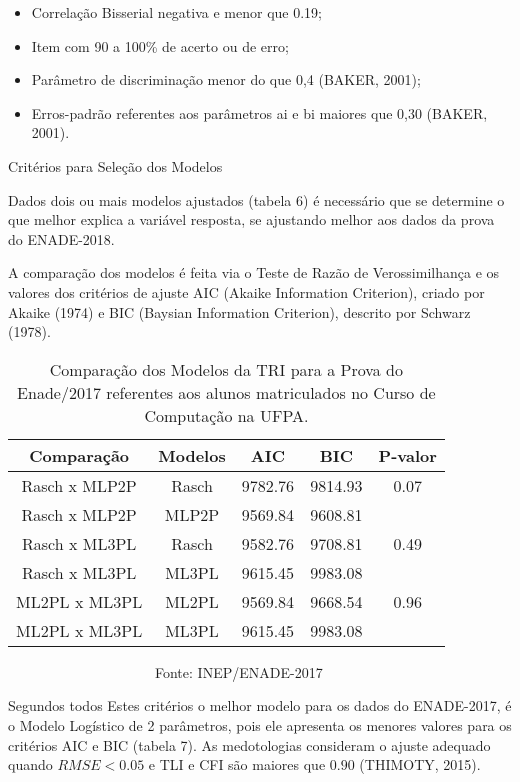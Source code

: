 \documentclass[12pt]{article}
\begin{document}
\begin{itemize}
\item Correlação Bisserial negativa e menor que 0.19;
\item Item com 90 a 100\% de acerto ou de erro;
\item Parâmetro de discriminação menor do que 0,4 (BAKER, 2001);
\item Erros-padrão referentes aos parâmetros ai e bi maiores que 0,30 (BAKER, 2001).
\end{itemize}

Critérios para Seleção dos Modelos

Dados dois ou mais modelos ajustados (tabela 6) é necessário que se determine o que melhor explica a variável resposta, se ajustando melhor aos dados da prova do ENADE-2018.

A comparação dos modelos é feita via o Teste de Razão de Verossimilhança e os valores dos critérios de ajuste AIC (Akaike Information Criterion), criado por Akaike (1974) e BIC (Baysian Information Criterion), descrito por Schwarz (1978). 

\begin{table}[h]
	\centering
	\caption{Comparação dos Modelos da TRI para a Prova do Enade/2017 referentes aos alunos matriculados no Curso de Computação na UFPA.}
\begin{tabular}{c|c|c|c|c}
\hline\hline 
     Comparação     & Modelos    & AIC       & BIC      & P-valor  \\
\hline\hline
 Rasch x MLP2P      &  Rasch     &  9782.76  & 9814.93  & 0.07       \\
 Rasch x MLP2P      &  MLP2P     &  9569.84  & 9608.81  &            \\
 \hline
 Rasch x ML3PL      &  Rasch     &  9582.76  & 9708.81  & 0.49        \\
 Rasch x ML3PL      &  ML3PL     &  9615.45  & 9983.08  &             \\
 \hline
 ML2PL x ML3PL      &  ML2PL     &  9569.84  & 9668.54  &  0.96        \\
ML2PL x ML3PL       &  ML3PL     &  9615.45  & 9983.08  &               \\
\hline\hline
\end{tabular}
\begin{flushleft}
\ \ \ \ \ \ \ \ \ \ \ \ \ \ \ \ \ \ \ \ \ Fonte: INEP/ENADE-2017
\end{flushleft}
\end{table}
\vskip0.3cm

Segundos todos Estes critérios o melhor modelo para os dados do ENADE-2017, é o Modelo Logístico de 2 parâmetros, pois ele apresenta os menores valores para os critérios AIC e BIC (tabela 7). As medotologias consideram o ajuste adequado quando $RMSE < 0.05$ e TLI e CFI são maiores que $0.90$ (THIMOTY, 2015).
\end{document}
